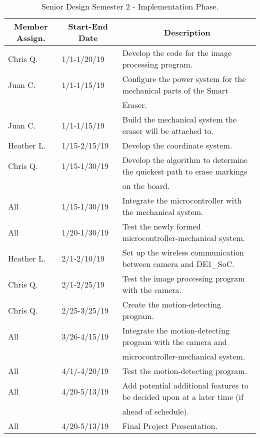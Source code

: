 \begin{table} [H]	
	\normalsize
	\centering
	\begin{tabular}{|l|l|l|}
		\hline
		\multicolumn{1}{|c|}{\textbf{Member Assign.}} & \multicolumn{1}{|c|}{\textbf{Start-End Date}} & \multicolumn{1}{|c|}{\textbf{Description}} \\
		\hline
		Chris Q. & 1/1-1/20/19 & Develop the code for the image processing program. \\
		\hline
		Juan C. & 1/1-1/15/19 & Configure the power system for the mechanical parts of the Smart \\
		& & Eraser. \\
		\hline
		Juan C. & 1/1-1/15/19 & Build the mechanical system the eraser will be attached to.\\
		\hline
		Heather L. & 1/15-2/15/19 & Develop the coordinate system. \\
		\hline
		Chris Q. & 1/15-1/30/19 & Develop the algorithm to determine the quickest path to erase markings \\
		& & on the board.\\
		\hline
		All & 1/15-1/30/19 & Integrate the microcontroller with the mechanical system.\\
		\hline
		All & 1/20-1/30/19 & Test the newly formed microcontroller-mechanical system.\\
		\hline
		Heather L. & 2/1-2/10/19 &
		Set up the wireless communication between camera and DE1\_SoC.\\
		\hline
		Chris Q. & 2/1-2/25/19 & Test the image processing program with the camera.\\
		\hline
		Chris Q. & 2/25-3/25/19 & Create the motion-detecting program.\\
		\hline
		All & 3/26-4/15/19 & Integrate the motion-detecting program with the camera and \\
		& & microcontroller-mechanical system.\\
		\hline
		All & 4/1/-4/20/19 & Test the motion-detecting program.\\
		\hline
		All & 4/20-5/13/19 & 
		Add potential additional features to be decided upon at a later time (if \\
		& & ahead of schedule).\\
		\hline
		All & 4/20-5/13/19 & 
		Final Project Presentation.\\
		\hline
	\end{tabular} 
	\caption{Senior Design Semester 2 - Implementation Phase.}
	\label{table:4}
\end{table}

